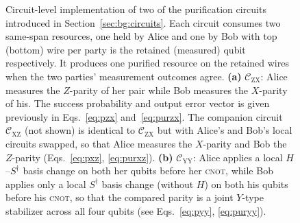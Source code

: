 \begin{figure}[hb]
    \caption[Circuit-level implementation of the purification circuits]{Circuit-level implementation of two of the purification circuits introduced in Section~\ref{sec:bg:circuits}. Each circuit consumes two same-span resources, one held by Alice and one by Bob with top (bottom) wire per party is the retained (measured) qubit respectively. It produces one purified resource on the retained wires when the two parties' measurement outcomes agree. \textbf{(a)} $\mathcal C_\mathrm{ZX}$: Alice measures the $Z$-parity of her pair while Bob measures the $X$-parity of his. The success probability and output error vector is given previously in Eqs.~\eqref{eq:pzx} and~\eqref{eq:purzx}. The companion circuit $\mathcal C_\mathrm{XZ}$ (not shown) is identical to $\mathcal C_\mathrm{ZX}$ but with Alice's and Bob's local circuits swapped, so that Alice measures the $X$-parity and Bob the $Z$-parity (Eqs.~\eqref{eq:pxz}, \eqref{eq:purxz}). \textbf{(b)} $\mathcal C_\mathrm{YY}$: Alice applies a local $H$--$S^\dagger$ basis change on both her qubits before her \textsc{cnot}, while Bob applies only a local $S^\dagger$ basis change (without $H$) on both his qubits before his \textsc{cnot}, so that the compared parity is a joint $Y$-type stabilizer across all four qubits (see Eqs.~\eqref{eq:pyy}, \eqref{eq:puryy}).}
    \label{fig:app:circuits}
\end{figure}